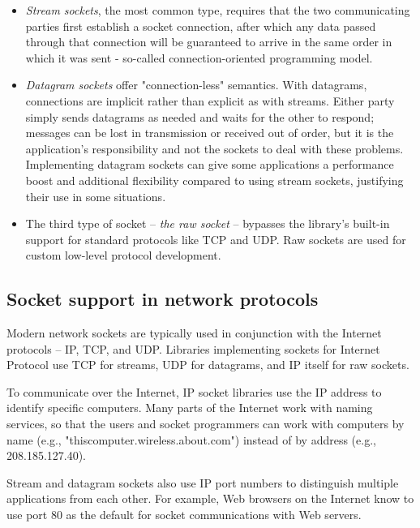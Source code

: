 \documentclass[a4paper,12pt]{article}
\begin{document}
\begin{itemize}
	\item \textit{Stream sockets}, the most common type, requires that the two communicating parties first establish a socket connection, after which any data passed through that connection will be guaranteed to arrive in the same order in which it was sent - so-called connection-oriented programming model.
	\item \textit{Datagram sockets} offer "connection-less" semantics. With datagrams, connections are implicit rather than explicit as with streams. Either party simply sends datagrams as needed and waits for the other to respond; messages can be lost in transmission or received out of order, but it is the application's responsibility and not the sockets to deal with these problems. Implementing datagram sockets can give some applications a performance boost and additional flexibility compared to using stream sockets, justifying their use in some situations.
	\item The third type of socket -- \textit{the raw socket} -- bypasses the library's built-in support for standard protocols like TCP and UDP. Raw sockets are used for custom low-level protocol development.
\end{itemize}

\subsection{Socket support in network protocols}
Modern network sockets are typically used in conjunction with the Internet protocols -- IP, TCP, and UDP. Libraries implementing sockets for Internet Protocol use TCP for streams, UDP for datagrams, and IP itself for raw sockets.


To communicate over the Internet, IP socket libraries use the IP address to identify specific computers. Many parts of the Internet work with naming services, so that the users and socket programmers can work with computers by name (e.g., "thiscomputer.wireless.about.com") instead of by address (e.g., 208.185.127.40).


Stream and datagram sockets also use IP port numbers to distinguish multiple applications from each other. For example, Web browsers on the Internet know to use port 80 as the default for socket communications with Web servers.
\end{document}
